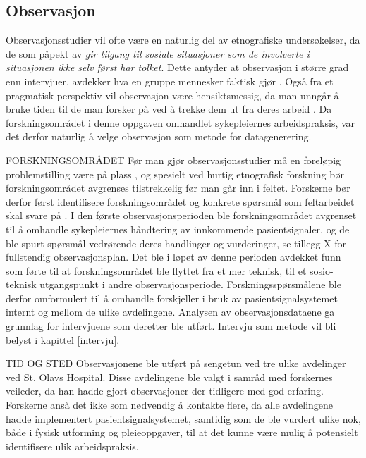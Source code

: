 \subsection{Observasjon}
\label{section:observasjon}
 
Observasjonsstudier vil ofte være en naturlig del av etnografiske undersøkelser, da de som påpekt av \citet{Tjora} \textit{gir tilgang til sosiale situasjoner som de involverte i situasjonen ikke selv først har tolket}. Dette antyder at observasjon i større grad enn intervjuer, avdekker hva en gruppe mennesker faktisk gjør \citep{Oates, Blomberg93, Tjora}. Også fra et pragmatisk perspektiv vil observasjon være hensiktsmessig, da man unngår å bruke tiden til de man forsker på ved å trekke dem ut fra deres arbeid \citep{Tjora}. Da forskningsområdet i denne oppgaven omhandlet sykepleiernes arbeidspraksis, var det derfor naturlig å velge observasjon som metode for datagenerering.
 
\noindent
FORSKNINGSOMRÅDET
Før man gjør observasjonsstudier må en foreløpig problemstilling være på plass \citep{Tjora}, og spesielt ved hurtig etnografisk forskning bør forskningsområdet avgrenses tilstrekkelig før man går inn i feltet. Forskerne bør derfor først identifisere forskningsområdet og konkrete spørsmål som feltarbeidet skal svare på \citep{Millen00}. I den første observasjonsperioden ble forskningsområdet avgrenset til å omhandle sykepleiernes håndtering av innkommende pasientsignaler, og de ble spurt spørsmål vedrørende deres handlinger og vurderinger, se tillegg X for fullstendig observasjonsplan. Det ble i løpet av denne perioden avdekket funn som førte til at forskningsområdet ble flyttet fra et mer teknisk, til et sosio-teknisk utgangspunkt i andre observasjonsperiode. Forskningsspørsmålene ble derfor omformulert til å omhandle forskjeller i bruk av pasientsignalsystemet internt og mellom de ulike avdelingene. Analysen av observasjonsdataene ga grunnlag for intervjuene som deretter ble utført. Intervju som metode vil bli belyst i kapittel \ref{intervju}.
 
\noindent
TID OG STED
Observasjonene ble utført på sengetun ved tre ulike avdelinger ved St. Olavs Hospital. Disse avdelingene ble valgt i samråd med forskernes veileder, da han hadde gjort observasjoner der tidligere med god erfaring. Forskerne anså det ikke som nødvendig å kontakte flere, da alle avdelingene hadde implementert pasientsignalsystemet, samtidig som de ble vurdert ulike nok, både i fysisk utforming og pleieoppgaver, til at det kunne være mulig å potensielt identifisere ulik arbeidspraksis.
 
